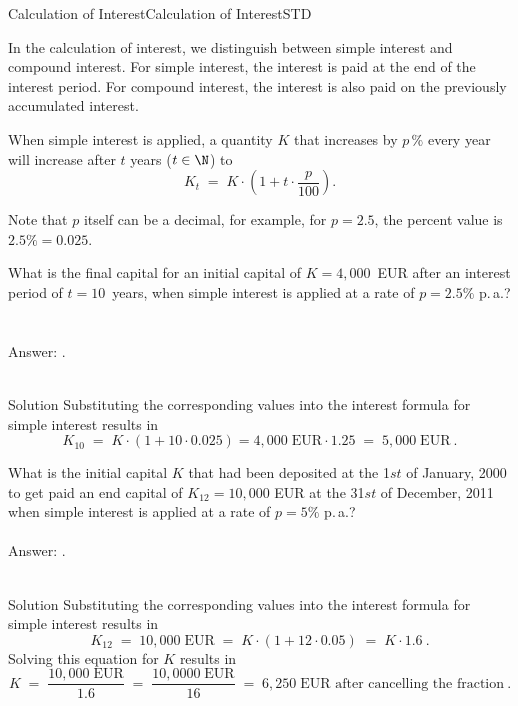 \begin{MXContent}{Calculation of Interest}{Calculation of Interest}{STD}

In the calculation of interest, we distinguish between simple interest and
compound interest. For simple interest, the interest is paid at the end of the 
interest period. For compound interest, the interest is also paid on the previously accumulated interest.

\begin{MInfo}
When simple interest is applied, a quantity $K$ that increases by $p\,\%$ every year will increase after $t$ years 
($t\in \N$) to
$$
K_{t}\; =\; K\cdot \left({ 1+ t\cdot \frac{p}{100}}\right).
$$

\end{MInfo}

Note that $p$ itself can be a decimal, for example, for $p=2.5$, the percent value is $2.5\%=0.025$. 

\begin{MExercise}
What is the final capital for an initial capital of $K=4{,}000$~EUR after an interest period of 
$t=10$~years, when simple interest is applied at a rate of $p=2.5\%$ p.\,a.?
\ \\ \ \\
Answer: .
\ \\ \ \\
\begin{MHint}{Solution}
Substituting the corresponding values into the interest formula for simple interest results in
$$
K_{10}\; =\; K\cdot \left({ 1 + 10\cdot 0.025}\right) =4{,}000\; \text{EUR} \cdot 1.25\; =\; 5{,}000\;\text{EUR}\: .
$$
\end{MHint}
\end{MExercise}

\begin{MExercise}
What is the initial capital $K$ that had been deposited at the 1$st$ of January, 2000 to get paid 
an end capital of $K_{12}=10{,}000$ EUR at the 31$st$ of December, 2011 when simple interest is applied
at a rate of $p=5\%$ p.\,a.?
\ \\ \ \\
Answer: .
\ \\ \ \\
\begin{MHint}{Solution}
Substituting the corresponding values into the interest formula for simple interest results in
$$
K_{12}\; =\; 10{,}000\;\text{EUR}\;  = \; K\cdot \left({1+12\cdot 0.05}\right)\; =\; K\cdot 1.6\: .
$$
Solving this equation for $K$ results in
$$
K\; =\; \frac{10{,}000\; \text{EUR}}{1.6}\;  =\; \frac{10{,}0000\;\text{EUR}}{16}\;=\;  6{,}250\;\text{EUR after cancelling the fraction}\: .
$$
\end{MHint}
\end{MExercise}


\end{MXContent}
